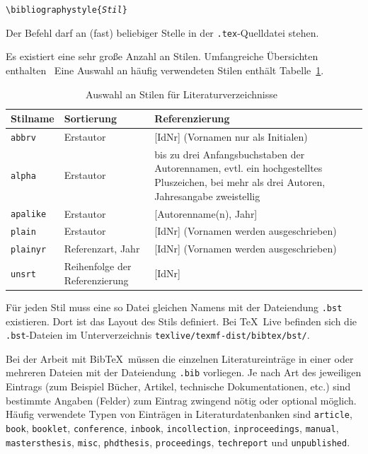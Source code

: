 \documentclass[a4paper,10pt,twoside]{scrbook}
\begin{document}
{\begin{boxedminipage}{\textwidth}
	\texttt{\textbackslash bibliographystyle\{\textsl{Stil}\}} 
\end{boxedminipage}


Der Befehl darf an (fast) beliebiger Stelle in der \verb!.tex!-Quelldatei stehen.


Es existiert eine sehr große Anzahl an Stilen. Umfangreiche Übersichten enthalten~\cite{voss2007referenz,BibtexStylesShareLaTeXWebseite} Eine Auswahl an häufig verwendeten Stilen enthält Tabelle~\ref{Tabelle_Stile_Literaturverzeichnisse}. 



\begin{table}[h!tb]
	\centering
	\caption[Auswahl an Stilen für Literaturverzeichnisse]{Auswahl an Stilen für Literaturverzeichnisse~\cite{Wikibooks_LaTeX_Woerterbuch}}
	\label{Tabelle_Stile_Literaturverzeichnisse}       %
	\begin{tabularx}{\textwidth}{lp{3cm}p{7.5cm}}
		\hline
		Stilname & Sortierung & Referenzierung  \\
		\hline
		\texttt{abbrv} & Erstautor & [IdNr] (Vornamen nur als Initialen) \\
		\texttt{alpha} & Erstautor & bis zu drei Anfangsbuchstaben der Autorennamen, evtl. ein hochgestelltes Pluszeichen, bei mehr als drei Autoren, Jahresangabe zweistellig \\			
		\texttt{apalike} & Erstautor & [Autorenname(n), Jahr] \\
		\texttt{plain}   & Erstautor & [IdNr] (Vornamen werden ausgeschrieben) \\
        \texttt{plainyr} & Referenzart, Jahr   & [IdNr] (Vornamen werden ausgeschrieben) \\
        \texttt{unsrt}   & Reihenfolge der Referenzierung & [IdNr] \\
		\hline
	\end{tabularx}
\end{table}

Für jeden Stil muss eine so Datei gleichen Namens mit der Dateiendung \verb!.bst! existieren. Dort ist das Layout des Stils definiert.
Bei \TeX~Live befinden sich die \verb!.bst!-Dateien im Unterverzeichnis \verb|texlive/texmf-dist/bibtex/bst/|.


Bei der Arbeit mit Bib\TeX\ müssen die einzelnen Literatureinträge in einer oder mehreren Dateien mit der Dateiendung
\verb|.bib| vorliegen. Je nach Art des jeweiligen Eintrags (zum Beispiel Bücher, Artikel, technische Dokumentationen, etc.) sind bestimmte Angaben (\glqq Felder\grqq) zum Eintrag zwingend nötig oder optional möglich. Häufig verwendete Typen von Einträgen in Literaturdatenbanken sind \texttt{article}, \texttt{book}, \texttt{booklet}, \texttt{conference}, \texttt{inbook}, \texttt{incollection}, \texttt{inproceedings}, \texttt{manual}, \texttt{mastersthesis}, \texttt{misc}, \texttt{phdthesis}, \texttt{proceedings}, \texttt{techreport} und \texttt{unpublished}.

}
\end{document}
